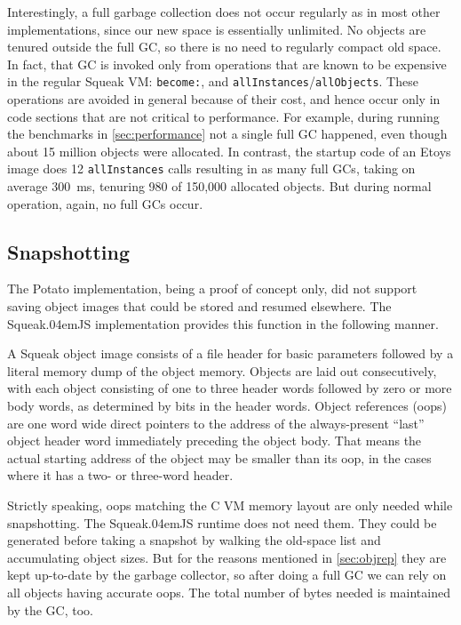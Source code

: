 \documentclass[natbib]{sigplanconf}
\newcommand*\SqueakJS{Squeak\texorpdfstring{\kern.04em}{}JS\xspace}
\begin{document}
Interestingly, a full garbage collection does not occur regularly as
in most other implementations, since our new space is essentially
unlimited. No objects are tenured outside the full \ac{GC}, so there
is no need to regularly compact old space. In fact, that \ac{GC} is
invoked only from operations that are known to be expensive in the
regular Squeak \ac{VM}: \lstinline|become:|, and
\lstinline|allInstances|\thinspace{}/\thinspace{}\lstinline|allObjects|.
These operations are avoided in general because of their cost, and
hence occur only in code sections that are not critical to
performance. For example, during running the benchmarks in
\autoref{sec:performance} not a single full \ac{GC} happened, even though
about 15 million objects were allocated. In contrast, the startup code
of an Etoys image does 12 \lstinline|allInstances| calls resulting in
as many full \acp{GC}, taking on average \SI{300}{\ms}, tenuring 980 of
150,000 allocated objects. But during normal operation, again, no full
\acp{GC} occur.

\subsection{Snapshotting}

The Potato implementation, being a proof of concept only, did not support
saving object images that could be stored and resumed elsewhere. The \SqueakJS
implementation provides this function in the following manner.

A Squeak object image consists of a file header for basic parameters
followed by a literal memory dump of the object memory. Objects are
laid out consecutively, with each object consisting of one to three
header words followed by zero or more body words, as determined by
bits in the header words. Object references (oops) are one word wide
direct pointers to the address of the always-present ``last'' object
header word immediately preceding the object body. That means the
actual starting address of the object may be smaller than its oop, in
the cases where it has a two- or three-word header.

Strictly speaking, oops matching the C \ac{VM} memory layout are only
needed while snapshotting. The \SqueakJS runtime does not need them.
They could be generated before taking a snapshot by walking the
old-space list and accumulating object sizes. But for the reasons
mentioned in \autoref{sec:objrep} they are kept up-to-date by the
garbage collector, so after doing a full \ac{GC} we can rely on all
objects having accurate oops. The total number of bytes needed is
maintained by the \ac{GC}, too.
\end{document}
